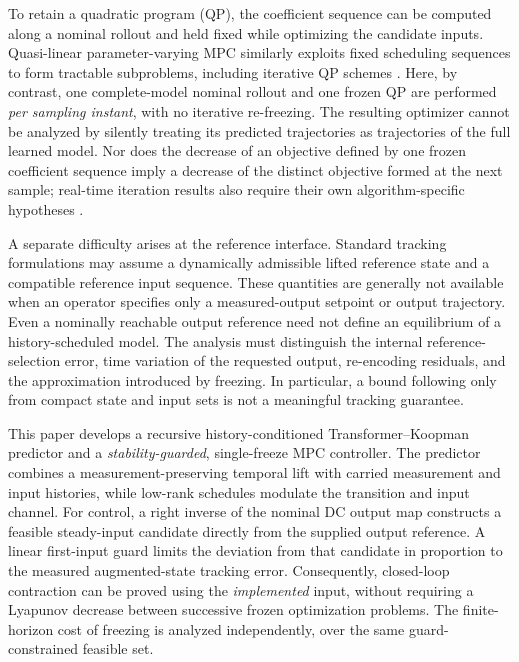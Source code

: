 \documentclass[journal]{IEEEtran}
\theoremstyle{plain}
\theoremstyle{definition}
\begin{document}
\begingroup\color{blue}
To retain a quadratic program (QP), the coefficient sequence can be computed along a nominal rollout and held fixed while optimizing the candidate inputs. Quasi-linear parameter-varying MPC similarly exploits fixed scheduling sequences to form tractable subproblems, including iterative QP schemes \cite{cisneros2016qlmpc,cisneros2020qlpv}. Here, by contrast, one complete-model nominal rollout and one frozen QP are performed \emph{per sampling instant}, with no iterative re-freezing. The resulting optimizer cannot be analyzed by silently treating its predicted trajectories as trajectories of the full learned model. Nor does the decrease of an objective defined by one frozen coefficient sequence imply a decrease of the distinct objective formed at the next sample; real-time iteration results also require their own algorithm-specific hypotheses \cite{diehl2005realtime,gros2020rti}.

A separate difficulty arises at the reference interface. Standard tracking formulations may assume a dynamically admissible lifted reference state and a compatible reference input sequence. These quantities are generally not available when an operator specifies only a measured-output setpoint or output trajectory. Even a nominally reachable output reference need not define an equilibrium of a history-scheduled model. The analysis must distinguish the internal reference-selection error, time variation of the requested output, re-encoding residuals, and the approximation introduced by freezing. In particular, a bound following only from compact state and input sets is not a meaningful tracking guarantee.

This paper develops a recursive history-conditioned Transformer--Koopman predictor and a \emph{stability-guarded}, single-freeze MPC controller. The predictor combines a measurement-preserving temporal lift with carried measurement and input histories, while low-rank schedules modulate the transition and input channel. For control, a right inverse of the nominal DC output map constructs a feasible steady-input candidate directly from the supplied output reference. A linear first-input guard limits the deviation from that candidate in proportion to the measured augmented-state tracking error. Consequently, closed-loop contraction can be proved using the \emph{implemented} input, without requiring a Lyapunov decrease between successive frozen optimization problems. The finite-horizon cost of freezing is analyzed independently, over the same guard-constrained feasible set.
\end{document}
